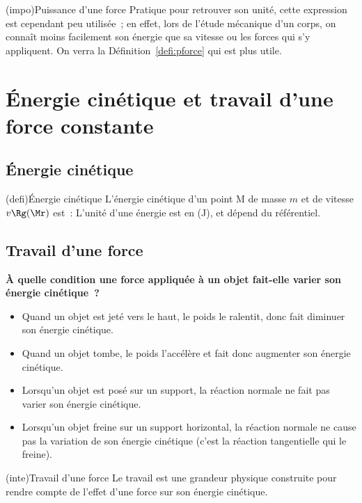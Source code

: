 \documentclass[../../main/main.tex]{subfiles}
\begin{document}
\begin{tcb*}(impo){Puissance d'une force}
	Pratique pour retrouver son unité, cette expression est cependant peu
	utilisée~; en effet, lors de l'étude mécanique d'un corps, on connaît moins
	facilement son énergie que sa vitesse ou les forces qui s'y appliquent. On
	verra la Définition~\ref{defi:pforce} qui est plus utile.
\end{tcb*}

\vspace{-10pt}
\section{Énergie cinétique et travail d'une force constante}
\vspace{-5pt}
\subsection{Énergie cinétique}
\vspace{-10pt}
\begin{tcb*}[sidebyside](defi){Énergie cinétique}
	L'énergie cinétique d'un point M de masse $m$ et de vitesse $v\Rg(\Mr)$ est~:
	\psw{
		\[\boxed{\Ec_{c}\Rg(\Mr) = \frac{1}{2}mv\Rg(\Mr)^2}\]
	}
	\vspace{-15pt}
	\tcblower
	L'unité d'une énergie est en  (J), et dépend du
	référentiel.
\end{tcb*}

\subsection{Travail d'une force}

\noindent
\textbf{À quelle condition une force appliquée à un objet fait-elle varier son
	énergie cinétique~?}
\begin{itemize}
	\item Quand un objet est jeté vers le haut, le poids le ralentit, donc fait
	      diminuer son énergie cinétique.
	\item Quand un objet tombe, le poids l'accélère et fait donc augmenter son
	      énergie cinétique.
	\item Lorsqu'un objet est posé sur un support, la réaction normale ne fait
	      pas varier son énergie cinétique.
	\item Lorsqu'un objet freine sur un support horizontal, la réaction normale
	      ne cause pas la variation de son énergie cinétique (c'est la réaction
	      tangentielle qui le freine).
\end{itemize}
\begin{tcb*}(inte){Travail d'une force}
	Le travail est une grandeur physique construite pour rendre compte de
	l'effet d'une force sur son énergie cinétique.
\end{tcb*}
\end{document}

